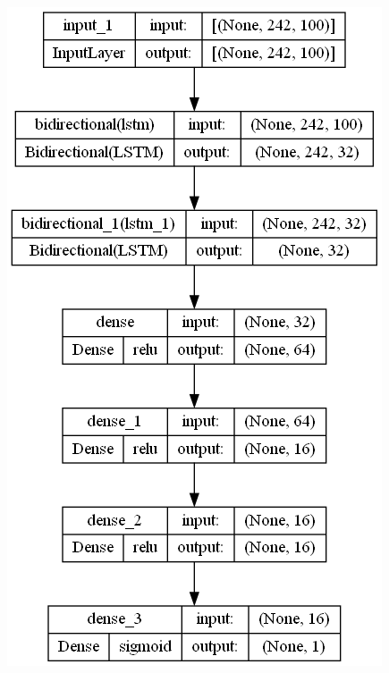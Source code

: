 \documentclass{article}
\begin{document}
\begin{figure}[!h]
    \centering\includegraphics[scale=.45]{./LSTM-[16, 16]}
    \caption{}\label{fig.44}
\end{figure}
\end{document}
